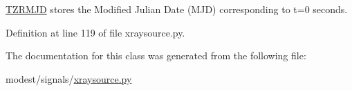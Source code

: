 \hyperlink{classmodest_1_1signals_1_1xraysource_1_1PeriodicXRaySource_aecd53533d34a4f821f4010c197edc2e8}{T\+Z\+R\+M\+JD} stores the Modified Julian Date (M\+JD) corresponding to t=0 seconds. 



Definition at line 119 of file xraysource.\+py.



The documentation for this class was generated from the following file\+:\begin{DoxyCompactItemize}
\item 
modest/signals/\hyperlink{xraysource_8py}{xraysource.\+py}\end{DoxyCompactItemize}
